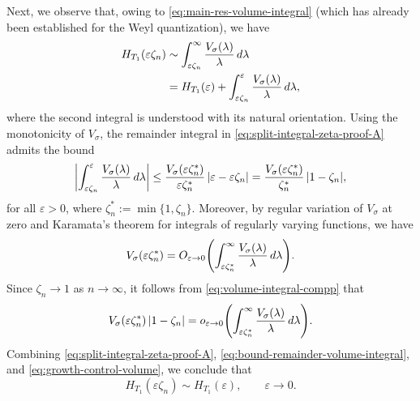 \documentclass[a4paper,12pt]{article}
\let\originalleft\left
\let\originalright\right
\renewcommand{\left}{\mathopen{}\mathclose\bgroup\originalleft}
\renewcommand{\right}{\aftergroup\egroup\originalright}
\begin{document}
Next, we observe that, owing to \eqref{eq:main-res-volume-integral} (which has already
been established for the Weyl quantization), we have
\begin{align}
H_{T_1}(\varepsilon\zeta_n)
&\sim
\int_{\varepsilon\zeta_n}^{\infty}\frac{V_\sigma(\lambda)}{\lambda}\,d\lambda \notag\\
&=
H_{T_1}(\varepsilon)
+
\int_{\varepsilon\zeta_n}^{\varepsilon}\frac{V_\sigma(\lambda)}{\lambda}\,d\lambda,
\label{eq:split-integral-zeta-proof-A}
\end{align}
where the second integral is understood with its natural orientation.
Using the monotonicity of $V_\sigma$, the remainder integral in
\eqref{eq:split-integral-zeta-proof-A} admits
the bound
\begin{equation}\label{eq:bound-remainder-volume-integral}
\left|
\int_{\varepsilon\zeta_n}^{\varepsilon}\frac{V_\sigma(\lambda)}{\lambda}\,d\lambda
\right|
\le
\frac{V_\sigma(\varepsilon\zeta_n^*)}{\varepsilon\zeta_n^*}
\,|\varepsilon-\varepsilon\zeta_n|
=
\frac{V_\sigma(\varepsilon\zeta_n^*)}{\zeta_n^*}\,|1-\zeta_n|,
\end{equation}
for all $\varepsilon>0$, where $\zeta_n^*:=\min\{1,\zeta_n\}$.
Moreover, by regular variation of $V_\sigma$ at zero and Karamata’s theorem for
integrals of regularly varying functions, we have
\begin{equation}\label{eq:volume-integral-compp}
V_\sigma(\varepsilon\zeta_n^*)
=
O_{\varepsilon\to0} \left(
\int_{\varepsilon\zeta_n^*}^{\infty}
\frac{V_\sigma(\lambda)}{\lambda}\,d\lambda
\right).
\end{equation}
Since $\zeta_n\to1$ as $n\to\infty$, it follows from
\eqref{eq:volume-integral-compp} that
\begin{equation}\label{eq:growth-control-volume}
V_\sigma(\varepsilon\zeta_n^*)\,|1-\zeta_n|
=
o_{\varepsilon\to0} \left(
\int_{\varepsilon\zeta_n^*}^{\infty}
\frac{V_\sigma(\lambda)}{\lambda}\,d\lambda
\right).
\end{equation}
Combining
\eqref{eq:split-integral-zeta-proof-A}, 
\eqref{eq:bound-remainder-volume-integral}, and
\eqref{eq:growth-control-volume}, we conclude that
\begin{equation}\label{eq:useful-relation3}
H_{T_1}(\varepsilon\zeta_n)
\sim
H_{T_1}(\varepsilon),
\qquad \varepsilon\to0.
\end{equation}
\end{document}
